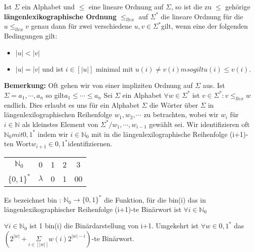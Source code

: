     Ist \(\Sigma\) ein Alphabet und \(\leq\)  eine lineare Ordnung auf \(\Sigma\), so ist die zu \(\leq\)  gehörige \textbf{längenlexikographische Ordnung} \(\leq_{llex}\) auf \(\Sigma^{*}\) die lineare Ordnung für die \(u \leq_{llex} v\) genau dann für zwei verschiedene \(u, v\in \Sigma^{*} \)gilt, wenn eine der folgenden Bedingungen gilt:
\begin{itemize}
    \item \(\lvert u \rvert < \lvert v \rvert\)
    \item \(\lvert u \rvert = \lvert v \rvert\) und ist \(i \in [|u|]\) minimal mit 
    \(u(i) \neq v(i)m so gilt u(i) \leq v(i)\).
\end{itemize}
\textbf{Bemerkung: }Oft gehen wir von einer impliziten Ordnung auf \(\Sigma\) aus. Ist \(\Sigma = {a_{1}, \cdots, a_{n}}\) so gilt\( a_{1}\leq \cdots \leq a_{n}
\)
    Sei \(\Sigma\) ein Alphabet \(\forall w \in \Sigma^{*}\) ist \({v\in \Sigma^{*} : v \leq_{llex}w}\) endlich. Dies erlaubt es uns für ein Alphabet \(\Sigma\) die Wörter über \(\Sigma\) in längenlexilographischen Reihenfolge \(w_{1}, w_{2}, \cdots\) zu betrachten, wobei wir \(w_{i}\) für \(i \in \mathbb{N}\) als kleinstes Element von \(\Sigma^{*}/{w_{1},\cdots, w_{i-1}}\) gewählt sei. Wir identifizieren oft \(\mathbb{N}_{0} mit {0, 1}^{*}\) indem wir \(i \in \mathbb{N}_{0}\) mit in die längenlexilographische Reihenfolge (i+1)-ten Wort\( w_{i+1} \in {0,1}^{*} \)identifiziernen.
    \begin{center}
        \begin{tabular}{ c c c c c }
            \(\mathbb{N}_{0}\) & 0 & 1 & 2 & 3\\ 
            \(\{0, 1\}^{*}\) & \(\lambda\) & 0 & 1 & 00\\
        \end{tabular}
    \end{center}

    Es bezeichnet bin : \(\mathbb{N}_{0} \rightarrow \{0, 1\}^{*}\) die Funktion, für die bin(i) das in längenlexikographischer Reihenfolge (i+1)-te Binärwort ist \(\forall i \in \mathbb{N}_{0}\)

    \(\forall i \in \mathbb{N}_{0}\) ist 1 bin(i) die Binärdarstellung von i+1. Umgekehrt ist \(\forall w \in {0, 1}^{*}\) das \((2^{|w|} + \underset{i \in [|w|]}{\Sigma} w(i) 2^{|w|-i})\)-te Binärwort.
